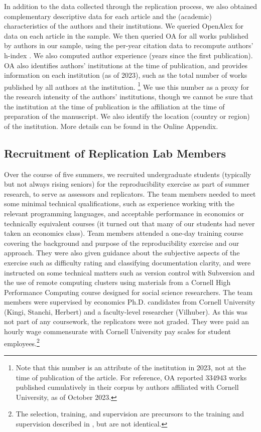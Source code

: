 \documentclass{cje} %
\theoremstyle{plain}%
\theoremstyle{definition}
\theoremstyle{remark}
\begin{document}
In addition to the data collected through the replication process, we also obtained complementary descriptive data for each article and the (academic) characteristics of the authors and their institutions. We queried OpenAlex \citep[OA,][]{openalex2022,ourresearch2023} for  data on each article in the sample. We then queried OA for all works published by authors in our sample, using the per-year citation data to recompute authors' h-index \citep{Hirsch2005}. We also computed author experience (years since the first publication). OA also identifies authors' institutions at the time of publication, and provides information on each institution (as of 2023), such as the total number of works published by all authors at the  institution.%
%
\footnote{Note that this number is an attribute of the institution in 2023, not at the time of publication of the article. For reference, OA reported 334943 works published cumulatively in their corpus by authors affiliated with Cornell University, as of October 2023.}
%
We use this number as a proxy for the research intensity of the authors' institutions, though we cannot be sure that the institution at the time of publication is the affiliation at the time of preparation of the manuscript. We also identify the location (country or region) of the institution.  More details can be found in the Online Appendix.

\subsection{Recruitment of Replication Lab Members}

Over the course of five summers, we recruited undergraduate students (typically but not always rising seniors) for the reproducibility exercise as part of summer research, to serve as assessors and replicators. The team members needed to meet some minimal technical qualifications, such as experience working with the relevant programming languages, and acceptable performance in economics or technically equivalent courses (it turned out that many of our students had never taken an economics class). Team members attended a one-day training course covering the background and purpose of the reproducibility exercise and our approach. They were also given guidance about the subjective aspects of the exercise such as difficulty rating and classifying documentation clarity, and were instructed on some technical matters such as version control with Subversion and the use of remote computing clusters using materials from a Cornell High Performance Computing course designed for social science researchers. The team members were supervised by economics Ph.D. candidates from Cornell University (Kingi, Stanchi, Herbert) and a faculty-level researcher (Vilhuber). As this was not part of any coursework, the replicators were not graded. They were paid an hourly wage commensurate with Cornell University pay scales for student employees.\footnote{The selection, training, and supervision are precursors to the training and supervision described in \cite{vilhuber2022b}, but are not identical.}
\end{document}
